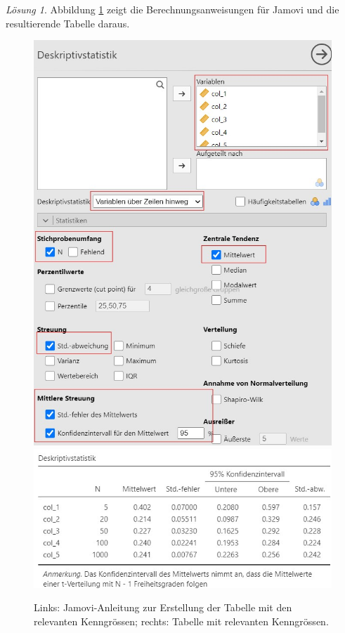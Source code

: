 \documentclass[
]{book}
\theoremstyle{definition}
\theoremstyle{definition}
\theoremstyle{definition}
\theoremstyle{definition}
\theoremstyle{remark}
\newtheorem*{solution}{Lösung}
\begin{document}
\begin{solution}

Abbildung \ref{fig:sol-ki-mean-n-vary} zeigt die Berechnungsanweisungen für Jamovi und die resultierende Tabelle daraus.

\begin{figure}
\includegraphics[width=0.5\linewidth]{figures/04-exr-stichprobengroesse-jmv-input} \includegraphics[width=0.5\linewidth]{figures/04-exr-stichprobengroesse-jmv-output} \caption{Links: Jamovi-Anleitung zur Erstellung der Tabelle mit den relevanten Kenngrössen; rechts: Tabelle mit relevanten Kenngrössen.}\label{fig:sol-ki-mean-n-vary}
\end{figure}


\end{solution}
\end{document}
